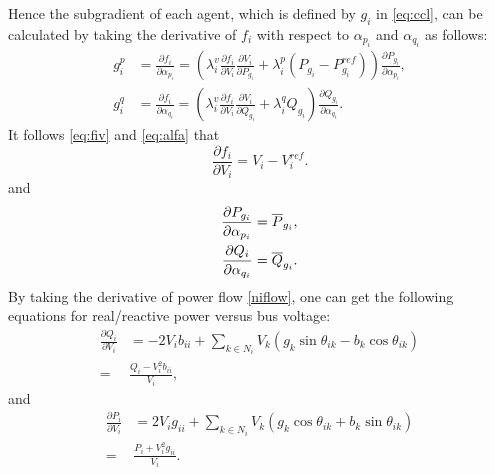 \documentclass{article}
\begin{document}
Hence the subgradient of each agent, which is defined by $g_i$ in \eqref{eq:ccl}, can be calculated by taking the derivative of $ f_i$ with respect to $\alpha_{p_i}$ and $\alpha_{q_i}$ as follows:
\begin{subequations}
 \begin{align}
g^p_i&=\frac{\partial f_i}{\partial\alpha_{p_i}}=(\lambda^v_i\frac{\partial f_i}{\partial V_i}\frac{\partial V_i}{\partial P_{g_i}}+\lambda^p_i(P_{g_i}-P^{ref}_{g_i}))\frac{\partial P_{g_i}}{\partial\alpha_{p_i}},     \label{eq:gip}
\\
 g^q_i&=\frac{\partial f_i}{\partial\alpha_{q_i}}=(\lambda^v_i\frac{\partial f_i}{\partial V_i}\frac{\partial V_i}{\partial Q_{g_i}}+\lambda^q_iQ_{g_i})\frac{\partial Q_{g_i}}{\partial\alpha_{q_i}}. \label{eq:giq} 
 \end{align}
 \label{eq:gi}
\end{subequations}
It follows \eqref{eq:fiv} and \eqref{eq:alfa} that 
\begin{equation}
\frac{\partial f_i}{\partial V_i}=V_i-V_i^{ref}.\label{eq:gi1}
\end{equation}
and 
\begin{subequations}
\begin{align}
\frac{\partial P_{g_i}}{\partial \alpha_{p_i}}&={\overline  P_{g_i}}, 
\\
\frac{\partial Q_{i}}{\partial \alpha_{q_i}}&={\overline Q_{g_i}}.\label{eq:gi2}
\end{align}\label{eq:dalfapq}\noindent
\end{subequations}
By taking the derivative of power flow \eqref{niflow}, one can get the following equations for real/reactive power versus bus voltage:
\begin{equation}
\begin{split}
\frac{\partial Q_i}{\partial V_i} &=-2 V_i b_{ii}+\sum_{k \in N_i} V_{k}(g_{k}\sin{ \theta_{ik}}-b_{k} \cos{\theta_{ik}})\\
    =&\frac{Q_i-V_i^2 b_{ii}}{V_i},
\end{split}\label{eq:qv}
\end{equation}
and
\begin{equation}
\begin{split}
\frac{\partial P_i}{\partial V_i} &=2 V_i g_{ii}+\sum_{k \in N_i} V_{k}(g_{k}\cos{ \theta_{ik}}+b_{k} \sin{\theta_{ik}})\\
    =&\frac{P_i+V_i^2 g_{ii}}{V_i}.
\end{split}\label{eq:pv}
\end{equation}
\end{document}
